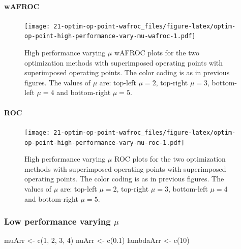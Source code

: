 \documentclass[
]{book}
\newenvironment{Shaded}{\begin{snugshade}}{\end{snugshade}}
\newcommand{\DecValTok}[1]{\textcolor[rgb]{0.00,0.00,0.81}{#1}}
\newcommand{\FloatTok}[1]{\textcolor[rgb]{0.00,0.00,0.81}{#1}}
\newcommand{\FunctionTok}[1]{\textcolor[rgb]{0.00,0.00,0.00}{#1}}
\newcommand{\NormalTok}[1]{#1}
\newcommand{\OtherTok}[1]{\textcolor[rgb]{0.56,0.35,0.01}{#1}}
\begin{document}
\hypertarget{wafroc-5}{%
\paragraph{wAFROC}\label{wafroc-5}}

\begin{figure}
\centering
\texttt{[image: 21-optim-op-point-wafroc\_files/figure-latex/optim-op-point-high-performance-vary-mu-wafroc-1.pdf]}
\caption{\label{fig:optim-op-point-high-performance-vary-mu-wafroc}High performance varying \(\mu\) wAFROC plots for the two optimization methods with superimposed operating points with superimposed operating points. The color coding is as in previous figures. The values of \(\mu\) are: top-left \(\mu = 2\), top-right \(\mu = 3\), bottom-left \(\mu = 4\) and bottom-right \(\mu = 5\).}
\end{figure}

\hypertarget{roc-5}{%
\paragraph{ROC}\label{roc-5}}

\begin{figure}
\centering
\texttt{[image: 21-optim-op-point-wafroc\_files/figure-latex/optim-op-point-high-performance-vary-mu-roc-1.pdf]}
\caption{\label{fig:optim-op-point-high-performance-vary-mu-roc}High performance varying \(\mu\) ROC plots for the two optimization methods with superimposed operating points with superimposed operating points. The color coding is as in previous figures. The values of \(\mu\) are: top-left \(\mu = 2\), top-right \(\mu = 3\), bottom-left \(\mu = 4\) and bottom-right \(\mu = 5\).}
\end{figure}

\hypertarget{optim-op-point-low-performance-vary-mu}{%
\subsubsection{\texorpdfstring{Low performance varying \(\mu\)}{Low performance varying \textbackslash mu}}\label{optim-op-point-low-performance-vary-mu}}

\begin{Shaded}
\begin{Highlighting}[]
\NormalTok{muArr }\OtherTok{\textless{}{-}} \FunctionTok{c}\NormalTok{(}\DecValTok{1}\NormalTok{, }\DecValTok{2}\NormalTok{, }\DecValTok{3}\NormalTok{, }\DecValTok{4}\NormalTok{)}
\NormalTok{nuArr }\OtherTok{\textless{}{-}} \FunctionTok{c}\NormalTok{(}\FloatTok{0.1}\NormalTok{)}
\NormalTok{lambdaArr }\OtherTok{\textless{}{-}} \FunctionTok{c}\NormalTok{(}\DecValTok{10}\NormalTok{)}
\end{Highlighting}
\end{Shaded}
\end{document}
